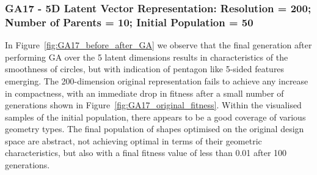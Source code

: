 \documentclass{article}
\begin{document}
\subsubsection*{GA17 - 5D Latent Vector Representation: Resolution = 200; Number of Parents = 10; Initial Population = 50}

In Figure~\ref{fig:GA17_before_after_GA} we observe that the final generation after performing GA over the 5 latent dimensions results in characteristics of the smoothness of circles, but with indication of pentagon like 5-sided features emerging. The 200-dimension original representation fails to achieve any increase in compactness, with an immediate drop in fitness after a small number of generations shown in Figure~\ref{fig:GA17_original_fitness}. Within the visualised samples of the initial population, there appears to be a good coverage of various geometry types. The final population of shapes optimised on the original design space are abstract, not achieving optimal in terms of their geometric characteristics, but also with a final fitness value of less than 0.01 after 100 generations.
\end{document}
